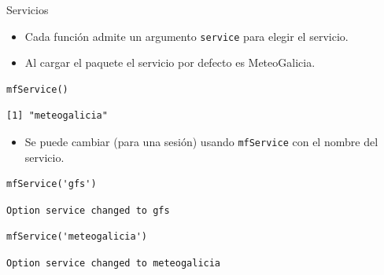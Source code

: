 \documentclass[xcolor={usenames,svgnames,dvipsnames}]{beamer}
\begin{document}
\begin{frame}[fragile,label=sec-2-2]{Servicios}
 \begin{itemize}
\item Cada función admite un argumento \texttt{service} para elegir el servicio.
\item Al cargar el paquete el servicio por defecto es MeteoGalicia.
\end{itemize}
\lstset{language=R,label= ,caption= ,numbers=none}
\begin{lstlisting}
mfService()
\end{lstlisting}

\begin{verbatim}
[1] "meteogalicia"
\end{verbatim}

\begin{itemize}
\item Se puede cambiar (para una sesión) usando \texttt{mfService} con el nombre
del servicio.
\end{itemize}
\lstset{language=R,label= ,caption= ,numbers=none}
\begin{lstlisting}
mfService('gfs')
\end{lstlisting}

\begin{verbatim}
Option service changed to gfs
\end{verbatim}

\lstset{language=R,label= ,caption= ,numbers=none}
\begin{lstlisting}
mfService('meteogalicia')
\end{lstlisting}

\begin{verbatim}
Option service changed to meteogalicia
\end{verbatim}
\end{frame}
\end{document}
